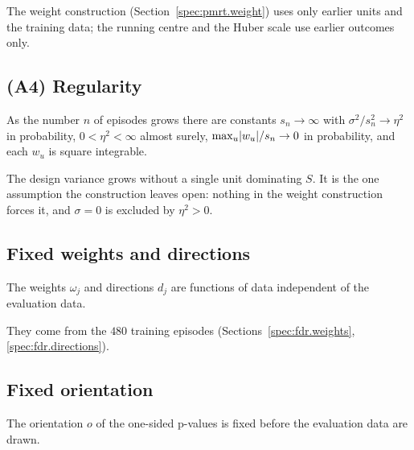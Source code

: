 \noindent The weight construction (Section~\ref{spec:pmrt.weight}) uses only earlier units and the training data; the running centre and the Huber scale use earlier outcomes only.


\subsection{(A4) Regularity}
\label{spec:asm.a4}

\begin{assumption}[Regularity]
As the number $n$ of episodes grows there are constants $s_n \to \infty$ with $\sigma^2 / s_n^2 \to \eta^2$ in probability, $0 < \eta^2 < \infty$ almost surely, $\max_u \lvert w_u\rvert / s_n \to 0$ in probability, and each $w_u$ is square integrable.
\end{assumption}

\noindent The design variance grows without a single unit dominating $S$. It is the one assumption the construction leaves open: nothing in the weight construction forces it, and $\sigma = 0$ is excluded by $\eta^2 > 0$.

\subsection{Fixed weights and directions}
\label{spec:asm.v2}

\begin{assumption}
The weights $\omega_j$ and directions $d_j$ are functions of data independent of the evaluation data.
\end{assumption}

\noindent They come from the $480$ training episodes (Sections~\ref{spec:fdr.weights}, \ref{spec:fdr.directions}).


\subsection{Fixed orientation}
\label{spec:asm.orient}

\begin{assumption}
The orientation $o$ of the one-sided p-values is fixed before the evaluation data are drawn.
\end{assumption}

